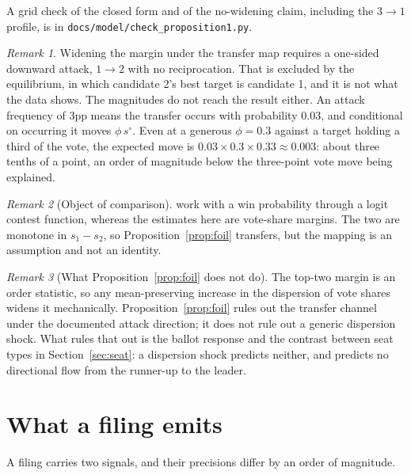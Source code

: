 \documentclass[11pt]{article}
\theoremstyle{definition}
\theoremstyle{remark}
\newtheorem*{remark}{Remark}
\begin{document}
A grid check of the closed form and of the no-widening claim, including the
$3 \to 1$ profile, is in \texttt{docs/model/check\_proposition1.py}.

\begin{remark}
Widening the margin under the transfer map requires a one-sided downward
attack, $1 \to 2$ with no reciprocation. That is excluded by the equilibrium,
in which candidate 2's best target is candidate 1, and it is not what the data
shows. The magnitudes do not reach the result either. An attack frequency of
3pp means the transfer occurs with probability $0.03$, and conditional on
occurring it moves $\phi\,s^\circ$. Even at a generous $\phi = 0.3$ against a
target holding a third of the vote, the expected move is $0.03 \times 0.3
\times 0.33 \approx 0.003$: about three tenths of a point, an order of
magnitude below the three-point vote move being explained.
\end{remark}

\begin{remark}[Object of comparison]
\citet{nakaguma2025} work with a win probability through a logit contest
function, whereas the estimates here are vote-share margins. The two are
monotone in $s_1 - s_2$, so Proposition~\ref{prop:foil} transfers, but the
mapping is an assumption and not an identity.
\end{remark}

\begin{remark}[What Proposition~\ref{prop:foil} does not do]
\label{rem:orderstat}
The top-two margin is an order statistic, so any mean-preserving increase in
the dispersion of vote shares widens it mechanically.
Proposition~\ref{prop:foil} rules out the transfer channel under the
documented attack direction; it does not rule out a generic dispersion shock.
What rules that out is the ballot response and the contrast between seat
types in Section~\ref{sec:seat}: a dispersion shock predicts neither, and
predicts no directional flow from the runner-up to the leader.
\end{remark}

\section{What a filing emits}
\label{sec:signals}

A filing carries two signals, and their precisions differ by an order of
magnitude.
\end{document}
